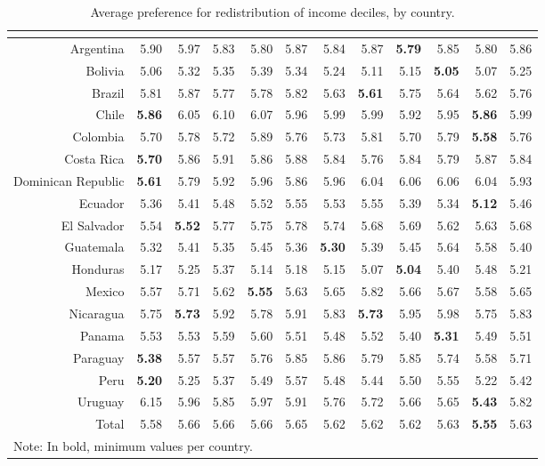 \documentclass[utf8]{frontiersSCNS} %
\begin{document}
\begin{table} [h]
\small\sf\centering
	\caption{Average preference for redistribution of income deciles, by country.}
	\label{tab2}
		\begin{tabular} {rrrrrrrrrrrr}
			\multicolumn{ 12 }{l}{ } \cr
			\toprule
			& D1 & D2 & D3 & D4 & D5 & D6 & D7 & D8 & D9 & D10 & Total \\
			\midrule
  Argentina & 5.90 & 5.97 & 5.83 & 5.80 & 5.87 & 5.84 & 5.87 & \textbf{5.79} & 5.85 & 5.80 & 5.86 \\
  Bolivia & 5.06 & 5.32 & 5.35 & 5.39 & 5.34 & 5.24 & 5.11 & 5.15 & \textbf{5.05} & 5.07 & 5.25 \\
  Brazil & 5.81 & 5.87 & 5.77 & 5.78 & 5.82 & 5.63 & \textbf{5.61} & 5.75 & 5.64 & 5.62 & 5.76 \\
  Chile & \textbf{5.86} & 6.05 & 6.10 & 6.07 & 5.96 & 5.99 & 5.99 & 5.92 & 5.95 & \textbf{5.86} & 5.99 \\
  Colombia & 5.70 & 5.78 & 5.72 & 5.89 & 5.76 & 5.73 & 5.81 & 5.70 & 5.79 & \textbf{5.58} & 5.76 \\
  Costa Rica & \textbf{5.70} & 5.86 & 5.91 & 5.86 & 5.88 & 5.84 & 5.76 & 5.84 & 5.79 & 5.87 & 5.84 \\
  Dominican Republic & \textbf{5.61} & 5.79 & 5.92 & 5.96 & 5.86 & 5.96 & 6.04 & 6.06 & 6.06 & 6.04 & 5.93 \\
  Ecuador & 5.36 & 5.41 & 5.48 & 5.52 & 5.55 & 5.53 & 5.55 & 5.39 & 5.34 & \textbf{5.12} & 5.46 \\
  El Salvador & 5.54 & \textbf{5.52} & 5.77 & 5.75 & 5.78 & 5.74 & 5.68 & 5.69 & 5.62 & 5.63 & 5.68 \\
  Guatemala & 5.32 & 5.41 & 5.35 & 5.45 & 5.36 & \textbf{5.30} & 5.39 & 5.45 & 5.64 & 5.58 & 5.40 \\
  Honduras & 5.17 & 5.25 & 5.37 & 5.14 & 5.18 & 5.15 & 5.07 & \textbf{5.04} & 5.40 & 5.48 & 5.21 \\
  Mexico & 5.57 & 5.71 & 5.62 & \textbf{5.55} & 5.63 & 5.65 & 5.82 & 5.66 & 5.67 & 5.58 & 5.65 \\
  Nicaragua & 5.75 & \textbf{5.73} & 5.92 & 5.78 & 5.91 & 5.83 & \textbf{5.73} & 5.95 & 5.98 & 5.75 & 5.83 \\
  Panama & 5.53 & 5.53 & 5.59 & 5.60 & 5.51 & 5.48 & 5.52 & 5.40 & \textbf{5.31} & 5.49 & 5.51 \\
  Paraguay & \textbf{5.38} & 5.57 & 5.57 & 5.76 & 5.85 & 5.86 & 5.79 & 5.85 & 5.74 & 5.58 & 5.71 \\
  Peru & \textbf{5.20} & 5.25 & 5.37 & 5.49 & 5.57 & 5.48 & 5.44 & 5.50 & 5.55 & 5.22 & 5.42 \\
  Uruguay & 6.15 & 5.96 & 5.85 & 5.97 & 5.91 & 5.76 & 5.72 & 5.66 & 5.65 & \textbf{5.43} & 5.82 \\
  Total & 5.58 & 5.66 & 5.66 & 5.66 & 5.65 & 5.62 & 5.62 & 5.62 & 5.63 & \textbf{5.55} & 5.63 \\
			\bottomrule	\multicolumn{12}{l}{\scriptsize{Note: In bold, minimum values per country.}}
		\end{tabular}
\end{table}
\end{document}
